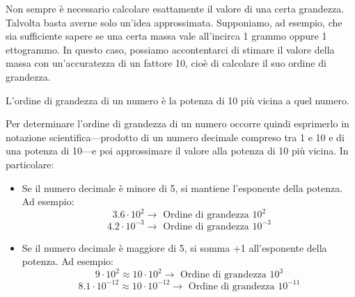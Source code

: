 Non sempre è necessario calcolare esattamente il valore di una certa grandezza.
Talvolta basta averne solo un'idea approssimata. Supponiamo, ad esempio, che sia
sufficiente sapere se una certa massa vale all'incirca 1 grammo oppure 1
ettogrammo. In questo caso, possiamo accontentarci di stimare il valore della
massa con un'accuratezza di un fattore 10, cioè di calcolare il suo ordine di
grandezza.

\begin{tcolorbox}[colback = yellow!30, colframe = yellow!30!black, title = {Ordine di grandezza}]
L'ordine di grandezza di un numero è la potenza di 10 più vicina a quel numero.
\end{tcolorbox}

\noindent Per determinare l'ordine di grandezza di un numero occorre quindi esprimerlo in
notazione scientifica—prodotto di un numero decimale compreso tra 1 e 10 e di
una potenza di 10—e poi approssimare il valore alla potenza di 10 più vicina.
In particolare:
\begin{itemize}
    \item Se il numero decimale è minore di 5, si mantiene l'esponente della
    potenza. Ad esempio:
    \[ 3.6 \cdot 10^2 \to \text{ Ordine di grandezza } 10^2 \]
    \[ 4.2 \cdot 10^{-3} \to \text{ Ordine di grandezza } 10^{-3} \]

    \item Se il numero decimale è maggiore di 5, si somma +1 all'esponente della
    potenza. Ad esempio:
    \[ 9 \cdot 10^2 \approx 10 \cdot 10^2 \to \text{ Ordine di grandezza } 10^3 \]
    \[ 8.1 \cdot 10^{-12} \approx 10 \cdot 10^{-12} \to \text{ Ordine di grandezza } 10^{-11} \]
\end{itemize}



